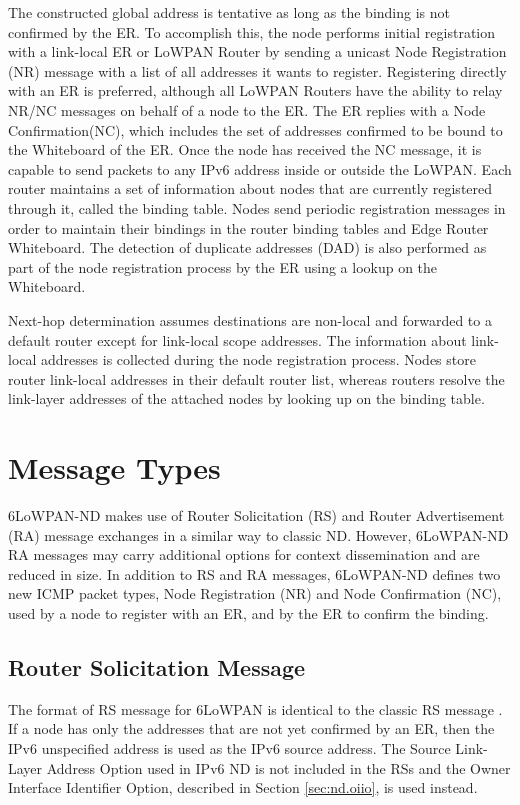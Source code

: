 The constructed global address is tentative as long as the binding is not confirmed by the ER. To accomplish this, the node performs initial registration with a link-local ER  or LoWPAN Router by sending a unicast Node Registration (NR) message with a list of all addresses it wants to register. Registering directly with an ER is preferred, although all LoWPAN Routers have the ability to relay NR/NC messages on behalf of a node to the ER. The ER replies with a Node Confirmation(NC), which includes the set of addresses confirmed to be bound to the Whiteboard of the ER. Once the node has received the NC message, it is capable to send packets to any IPv6 address inside or outside the LoWPAN. Each router maintains a set of information about nodes that are currently registered through it, called the binding table. Nodes send periodic registration messages in order to maintain their bindings in the router binding tables and Edge Router Whiteboard. The detection of duplicate addresses (DAD) is also performed as part of the node registration process by the ER using a lookup on the Whiteboard. 

Next-hop determination assumes destinations are non-local and forwarded to a default router except for link-local scope addresses. The information about link-local addresses is collected during the node registration process. Nodes store router link-local addresses in their default router list, whereas routers resolve the link-layer addresses of the attached nodes by looking up on the binding table. 

\section{Message Types}

6LoWPAN-ND makes use of Router Solicitation (RS) and Router Advertisement (RA) message exchanges in a similar way to classic ND. However, 6LoWPAN-ND RA messages may carry additional options for context dissemination and are reduced in size. In addition to RS and RA messages, 6LoWPAN-ND defines two new ICMP packet types, Node Registration (NR) and Node Confirmation (NC), used by a node to register with an ER, and by the ER to confirm the
binding. 

\subsection{Router Solicitation Message}
The format of RS message for 6LoWPAN is identical to the classic RS message \cite{rfc4861}. If a node has only the addresses that are not yet confirmed by an ER, then the IPv6 unspecified address is used as the IPv6 source address. The Source Link-Layer Address Option \cite{rfc4861} used in IPv6 ND is not included in the RSs and the Owner Interface Identifier Option, described in Section \ref{sec:nd.oiio}, is used instead.

